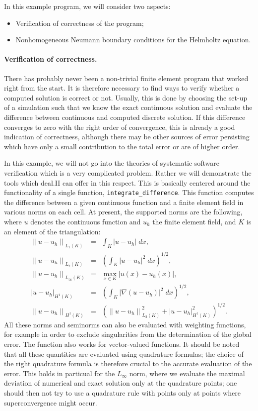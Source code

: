 \documentclass{article}
\begin{document}
In this example program, we will consider two aspects:
\begin{itemize}
\item Verification of correctness of the program;
\item Nonhomogeneous Neumann boundary conditions for the Helmholtz equation.
\end{itemize}

\paragraph{Verification of correctness.} There has probably never been a
non-trivial finite element program that worked right from the start. It is
therefore necessary to find ways to verify whether a computed solution is
correct or not. Usually, this is done by choosing the set-up of a simulation
such that we know the exact continuous solution and evaluate the difference
between continuous and computed discrete solution. If this difference
converges to zero with the right order of convergence, this is already a good
indication of correctness, although there may be other sources of error
persisting which have only a small contribution to the total error or are of
higher order.

In this example, we will not go into the theories of systematic software
verification which is a very complicated problem. Rather we will demonstrate
the tools which deal.II can offer in this respect. This is basically centered
around the functionality of a single function, \texttt{integrate\_difference}.
This function computes the difference between a given continuous function and
a finite element field in various norms on each cell. At present, the
supported norms are the following, where $u$ denotes the continuous function
and $u_h$ the finite element field, and $K$ is an element of the
triangulation:
\begin{eqnarray*}
  {\| u-u_h \|}_{L_1(K)} &=& \int_K |u-u_h| \; dx,
  \\
  {\| u-u_h \|}_{L_2(K)} &=& \left( \int_K |u-u_h|^2 \; dx \right)^{1/2},
  \\
  {\| u-u_h \|}_{L_\infty(K)} &=& \max_{x  \in K} |u(x) - u_h(x)|,
  \\
  {| u-u_h |}_{H^1(K)} &=& \left( \int_K |\nabla(u-u_h)|^2 \; dx \right)^{1/2},
  \\
  {\| u-u_h \|}_{H^1(K)} &=& \left( {\| u-u_h \|}^2_{L_2(K)} 
                                   +{| u-u_h |}^2_{H^1(K)}    \right)^{1/2}.
\end{eqnarray*}
All these norms and seminorms can also be evaluated with weighting functions,
for example in order to exclude singularities from the determination of the
global error. The function also works for vector-valued functions.  It should
be noted that all these quantities are evaluated using quadrature formulas;
the choice of the right quadrature formula is therefore crucial to the
accurate evaluation of the error. This holds in particual for the $L_\infty$
norm, where we evaluate the maximal deviation of numerical and exact solution
only at the quadrature points; one should then not try to use a quadrature
rule with points only at points where superconvergence might occur.
\end{document}
